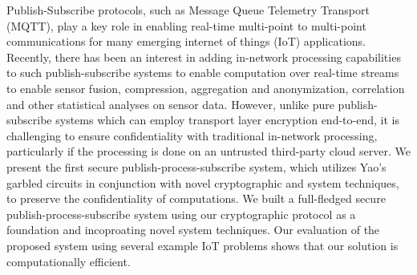 Publish-Subscribe protocols, such as Message Queue Telemetry Transport
(MQTT), play a key role in enabling real-time multi-point to multi-point
communications for many emerging internet of things (IoT) applications.
Recently, there has been an interest in adding in-network processing
capabilities to such publish-subscribe systems to enable computation over
real-time streams to enable sensor fusion, compression, aggregation and
anonymization, correlation and other statistical analyses on sensor data.
However, unlike pure publish-subscribe systems which can employ transport
layer encryption end-to-end, it is challenging to ensure confidentiality
with traditional in-network processing, particularly if the processing is
done on an untrusted third-party cloud server. We present the first secure
publish-process-subscribe system, which utilizes Yao's garbled circuits in
conjunction with novel cryptographic and system techniques, to preserve the
confidentiality of computations. We built a full-fledged secure
publish-process-subscribe system using our cryptographic protocol as a
foundation and incoproating novel system techniques. Our evaluation of the
proposed system using several example IoT problems shows that our solution
is computationally efficient.
